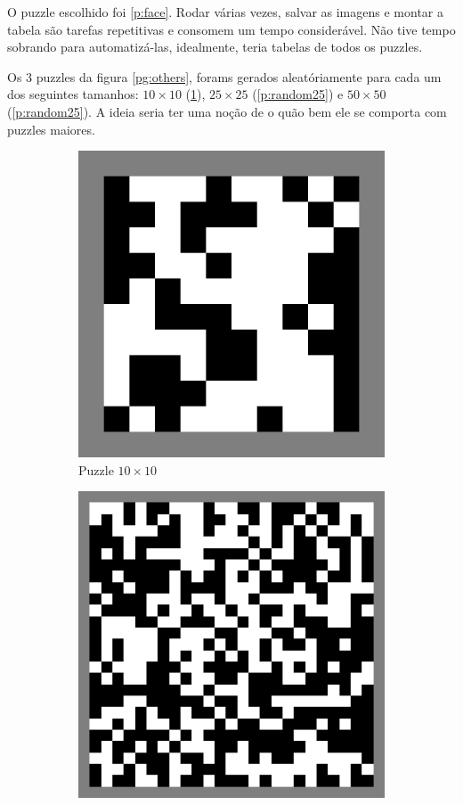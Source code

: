 \documentclass{article}
\begin{document}
O puzzle escolhido foi \ref{p:face}.
Rodar várias vezes, salvar as imagens e montar a tabela
são tarefas repetitivas e consomem um tempo considerável.
Não tive tempo sobrando para automatizá-las,
idealmente, teria tabelas de todos os puzzles.

Os 3 puzzles da figura \ref{pg:others},
forams gerados aleatóriamente
para cada um dos seguintes tamanhos:
\(10 \times 10\) (\ref{p:random10}),
\(25 \times 25\) (\ref{p:random25}) e
\(50 \times 50\) (\ref{p:random25}).
A ideia seria ter uma noção de o quão bem
ele se comporta com puzzles maiores.

\begin{figure}[h]
    \centering
    \begin{subfigure}{0.3\textwidth}
        \centering
        \includegraphics[width=0.9\linewidth]{random10-border}
        \caption{Puzzle \(10 \times 10\)}
        \label{p:random10}
    \end{subfigure}
    \begin{subfigure}{0.3\textwidth}
        \centering
        \includegraphics[width=0.9\linewidth]{random25-border}

\end{subfigure}
\end{figure}
\end{document}

